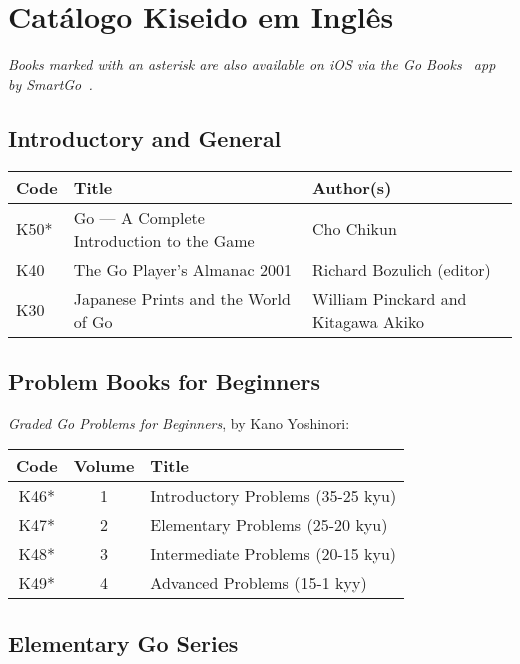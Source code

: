\chapter{Catálogo Kiseido em Inglês}\label{ap:en}

\emph{Books marked with an asterisk are also available on iOS via the Go Books~\cite{gobooks} app by SmartGo~\cite{smartgo}.}

\section{Introductory and General}

\begin{longtable}{l|p{50mm}|p{50mm}} 
    \hline
    \textbf{Code} & \textbf{Title} & \textbf{Author(s)} \\
    \hline \hline
    K50* & Go --- A Complete Introduction to the Game & Cho Chikun \\
    \hline
    K40 & The Go Player's Almanac 2001 & Richard Bozulich (editor) \\
    \hline
    K30 & Japanese Prints and the World of Go & William Pinckard and Kitagawa Akiko \\
    \hline
\end{longtable}


\section{Problem Books for Beginners}

\emph{Graded Go Problems for Beginners}, by Kano Yoshinori:

\begin{longtable}{c|c|l} 
    \hline
    \textbf{Code} & \textbf{Volume} & \textbf{Title} \\
    \hline \hline
    K46* & 1 & Introductory Problems (35-25 kyu) \\
    \hline
    K47* & 2 & Elementary Problems (25-20 kyu) \\
    \hline
    K48* & 3 & Intermediate Problems (20-15 kyu) \\
    \hline
    K49* & 4 & Advanced Problems (15-1 kyy) \\
    \hline
\end{longtable}


\section{Elementary Go Series}

